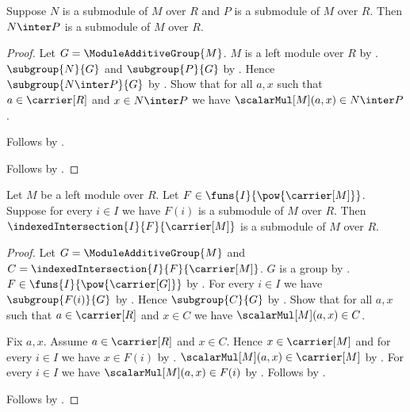 \begin{theorem}\label{submodule_intersection}
    Suppose $N$ is a submodule of $M$ over $R$ and
        $P$ is a submodule of $M$ over $R$.
    Then $N\inter P$ is a submodule of $M$ over $R$.
\end{theorem}
\begin{proof}
    Let $G=\ModuleAdditiveGroup{M}$.
    $M$ is a left module over $R$ by .
    $\subgroup{N}{G}$ and $\subgroup{P}{G}$ by
        .
    Hence $\subgroup{N\inter P}{G}$ by
        .
    Show that for all $a,x$ such that $a\in\carrier[R]$ and
        $x\in N\inter P$ we have $\scalarMul[M](a,x)\in N\inter P$.
    \begin{subproof}
        Follows by
            .
    \end{subproof}
    Follows by .
\end{proof}

\begin{theorem}\label{submodule_indexed_intersection}
    Let $M$ be a left module over $R$.
    Let $F\in\funs{I}{\pow{\carrier[M]}}$.
    Suppose for every $i\in I$ we have
        $F(i)$ is a submodule of $M$ over $R$.
    Then $\indexedIntersection{I}{F}{\carrier[M]}$
        is a submodule of $M$ over $R$.
\end{theorem}
\begin{proof}
    Let $G=\ModuleAdditiveGroup{M}$ and
        $C=\indexedIntersection{I}{F}{\carrier[M]}$.
    $G$ is a group by .
    $F\in\funs{I}{\pow{\carrier[G]}}$ by
        .
    For every $i\in I$ we have $\subgroup{F(i)}{G}$ by
        .
    Hence $\subgroup{C}{G}$ by
        .
    Show that for all $a,x$ such that $a\in\carrier[R]$ and $x\in C$
        we have $\scalarMul[M](a,x)\in C$.
    \begin{subproof}
        Fix $a,x$.
        Assume $a\in\carrier[R]$ and $x\in C$.
        Hence $x\in\carrier[M]$ and for every $i\in I$ we have
            $x\in F(i)$ by .
        $\scalarMul[M](a,x)\in\carrier[M]$ by
            .
        For every $i\in I$ we have $\scalarMul[M](a,x)\in F(i)$ by
            .
        Follows by .
    \end{subproof}
    Follows by .
\end{proof}

